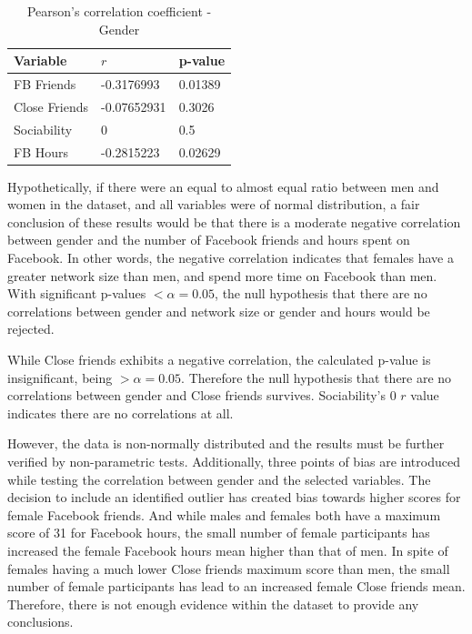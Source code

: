 \begin{table}[H]
\centering
\caption{Pearson's correlation coefficient - Gender}
\begin{tabular}{l|l|l}
Variable      & $r$         & p-value \\ \hline
FB Friends    & -0.3176993  & 0.01389 \\ \hline
Close Friends & -0.07652931 & 0.3026  \\ \hline
Sociability   & 0           & 0.5     \\ \hline
FB Hours      & -0.2815223  & 0.02629 \\ \hline
\end{tabular}
\end{table}

Hypothetically, if there were an equal to almost equal ratio between men and women in the dataset, and all variables were of normal distribution, a fair conclusion of these results would be that there is a moderate negative correlation between gender and the number of Facebook friends and hours spent on Facebook. In other words, the negative correlation indicates that females have a greater network size than men, and spend more time on Facebook than men. With significant p-values $< \alpha = 0.05$, the null hypothesis that there are no correlations between gender and network size or gender and hours would be rejected. 

While Close friends exhibits a negative correlation, the calculated p-value is insignificant, being $> \alpha = 0.05$. Therefore the null hypothesis that there are no correlations between gender and Close friends survives. Sociability's 0 $r$ value indicates there are no correlations at all.

However, the data is non-normally distributed and the results must be further verified by non-parametric tests. Additionally, three points of bias are introduced while testing the correlation between gender and the selected variables. The decision to include an identified outlier has created bias towards higher scores for female Facebook friends. And while males and females both have a maximum score of 31 for Facebook hours, the small number of female participants has increased the female Facebook hours mean higher than that of men. In spite of females having a much lower Close friends maximum score than men, the small number of female participants has lead to an increased female Close friends mean. Therefore, there is not enough evidence within the dataset to provide any conclusions.


